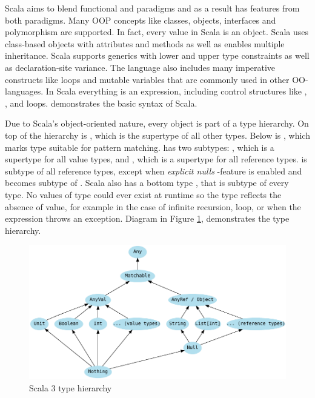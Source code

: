 Scala aims to blend functional and  paradigms and as a result has features from both paradigms. Many OOP concepts like classes, objects, interfaces and polymorphism are supported. In fact, every value in Scala is an object. Scala uses class-based objects with attributes and methods as well as enables multiple inheritance. Scala supports generics with lower and upper type constraints as well as declaration-site variance. The language also includes many imperative constructs like loops and mutable variables that are commonly used in other OO-languages. In Scala everything is an expression, including control structures like , , and loops.  demonstrates the basic syntax of Scala.



Due to Scala's object-oriented nature, every object is part of a type hierarchy. On top of the hierarchy is , which is the supertype of all other types. Below  is , which marks type suitable for pattern matching.  has two subtypes: , which is a supertype for all value types, and , which is a supertype for all reference types.  is subtype of all reference types, except when \textit{explicit nulls} -feature is enabled and  becomes subtype of . Scala also has a bottom type , that is subtype of every type. No values of type  could ever exist at runtime so the type reflects the absence of value, for example in the case of infinite recursion, loop, or when the expression throws an exception. Diagram in Figure \ref{fig:scala-type-hierarchy}, demonstrates the type hierarchy.

\begin{figure}
    \centering
    \includegraphics{images/type-hierarchy}
    \caption{Scala 3 type hierarchy}
    \label{fig:scala-type-hierarchy}
\end{figure}


